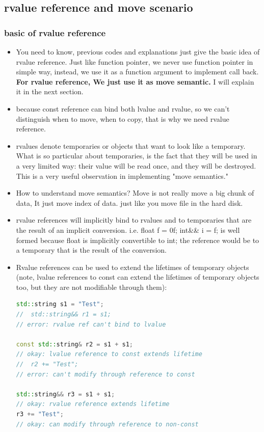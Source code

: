 \documentclass[a4paper,12pt,twoside]{book}
\begin{document}
\subsection{rvalue reference and move scenario}
\subsubsection{basic of rvalue reference}
\begin{itemize}

\item You need to know,  previous codes and explanations just give the basic idea of rvalue reference. Just like function pointer, we never use function pointer in simple way, instead, we use it as a function argument to implement call back.  \textbf{For rvalue reference, We just use it as move semantic.} I will explain it in the next section.

\item because const reference can bind both lvalue and rvalue, so we can't distinguish when to move, when to copy, that is why we need rvalue reference. 

\item rvalues denote temporaries or objects that want to look like a temporary. What is so particular about temporaries, is the fact that they will be used in a very limited way: their value will be read once, and they will be destroyed. This is a very useful observation in implementing "move semantics." 

\item How to understand move semantics? Move is not really move a big chunk of data, It just move index of data. just like you move file in the hard disk. 

\item rvalue references will implicitly bind to rvalues and to temporaries that are the result of an implicit conversion. i.e. float f = 0f; int\&\& i = f; is well formed because float is implicitly convertible to int; the reference would be to a temporary that is the result of the conversion.

\item Rvalue references can be used to extend the lifetimes of temporary objects (note, lvalue references to const can extend the lifetimes of temporary objects too, but they are not modifiable through them):

\begin{lstlisting}[frame=single, language=c++, mathescape=true]
std::string s1 = "Test";
//  std::string&& r1 = s1;           
// error: rvalue ref can't bind to lvalue

const std::string& r2 = s1 + s1; 
// okay: lvalue reference to const extends lifetime
//  r2 += "Test";                    
// error: can't modify through reference to const

std::string&& r3 = s1 + s1;      
// okay: rvalue reference extends lifetime
r3 += "Test";                    
// okay: can modify through reference to non-const
\end{lstlisting}

\end{itemize}
\end{document}
